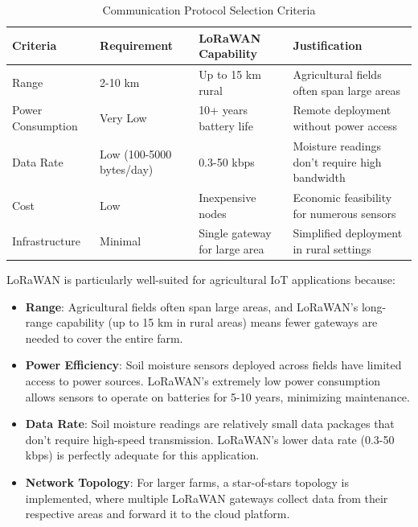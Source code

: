 \documentclass[12pt,a4paper]{article}
\begin{document}
\begin{table}[H]
\centering
\begin{tabular}{@{}llll@{}}
\toprule
\textbf{Criteria} & \textbf{Requirement} & \textbf{LoRaWAN Capability} & \textbf{Justification} \\
\midrule
Range & 2-10 km & Up to 15 km rural & Agricultural fields often span large areas \\
Power Consumption & Very Low & 10+ years battery life & Remote deployment without power access \\
Data Rate & Low (100-5000 bytes/day) & 0.3-50 kbps & Moisture readings don't require high bandwidth \\
Cost & Low & Inexpensive nodes & Economic feasibility for numerous sensors \\
Infrastructure & Minimal & Single gateway for large area & Simplified deployment in rural settings \\
\bottomrule
\end{tabular}
\caption{Communication Protocol Selection Criteria}
\label{tab:communication}
\end{table}

LoRaWAN is particularly well-suited for agricultural IoT applications because:

\begin{itemize}
    \item \textbf{Range}: Agricultural fields often span large areas, and LoRaWAN's long-range capability (up to 15 km in rural areas) means fewer gateways are needed to cover the entire farm.
    
    \item \textbf{Power Efficiency}: Soil moisture sensors deployed across fields have limited access to power sources. LoRaWAN's extremely low power consumption allows sensors to operate on batteries for 5-10 years, minimizing maintenance.
    
    \item \textbf{Data Rate}: Soil moisture readings are relatively small data packages that don't require high-speed transmission. LoRaWAN's lower data rate (0.3-50 kbps) is perfectly adequate for this application.
    
    \item \textbf{Network Topology}: For larger farms, a star-of-stars topology is implemented, where multiple LoRaWAN gateways collect data from their respective areas and forward it to the cloud platform.
\end{itemize}
\end{document}
